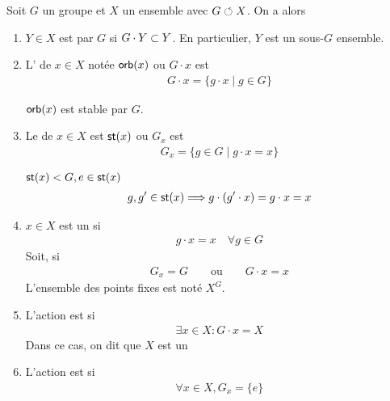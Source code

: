 \documentclass[french,a4paper,10pt]{article}
\begin{document}
	\begin{definition}
		Soit $G$ un groupe et $X$ un ensemble avec $G\circlearrowleft X$. On a alors
		\begin{enumerate}[label=$(\roman*)$]
			\item $Y\in X$ est  par $G$ si $G\cdot Y\subset Y$. En particulier, $Y$ est un sous-$G$ ensemble.
			
			\item L' de $x\in X$ notée $\operatorname{\mathsf{orb}}(x)$ ou $G\cdot x$ est
				\[\begin{aligned}
					G\cdot x = \{g\cdot x\mid g\in G\}
				\end{aligned}\]
				\begin{remark}
					$\operatorname{\mathsf{orb}}(x)$ est stable par $G$.
				\end{remark}
			
			\item Le  de $x\in X$ est $\operatorname{\mathsf{st}}(x)$ ou $G_x$ est 
				\[\begin{aligned}
					G_x=\{g\in G\mid g\cdot x=x\}
				\end{aligned}\]
				\begin{remark}
					$\operatorname{\mathsf{st}}(x)<G,e\in\operatorname{\mathsf{st}}(x)$
					\[\begin{aligned}
						g,g'\in \operatorname{\mathsf{st}}(x)\Longrightarrow g\cdot(g'\cdot x)=g\cdot x=x
					\end{aligned}\]
				\end{remark}
			\item $x\in X$ est un  si 
				\[\begin{aligned}
					g\cdot x=x\quad \forall g\in G
				\end{aligned}\]
				Soit, si 
					\[\begin{aligned}
						G_x=G\qquad \text{ou}\qquad G\cdot x=x
					\end{aligned}\]
				L'ensemble des points fixes est noté $X^G$.
				
			\item L'action est  si 
				\[\begin{aligned}
					\exists x\in X\colon G\cdot x=X
				\end{aligned}\]
				Dans ce cas, on dit que $X$ est un 
				
			\item L'action est  si 
				\[\begin{aligned}
					\forall x\in X, G_x=\{e\}
				\end{aligned}\]
		\end{enumerate}
	\end{definition}
\end{document}
